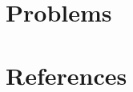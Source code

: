 \documentclass[11pt]{article}
\begin{document}
\section{Problems}
\label{sec:orgc335bde}


\section{References}
\label{sec:orgb1bf9db}
\label{bibliographystyle link}



\end{document}
